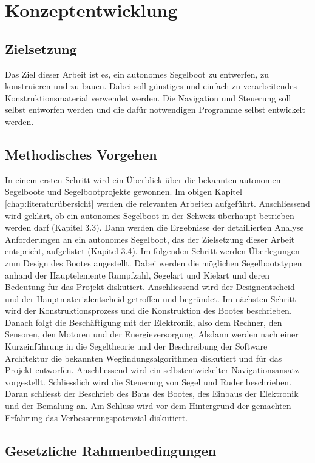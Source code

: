 
\chapter{Konzeptentwicklung }
\label{chap:konzeptentwicklung}
\section{Zielsetzung}
Das Ziel dieser Arbeit ist es, ein autonomes Segelboot zu entwerfen, zu konstruieren und zu bauen. Dabei soll günstiges und einfach zu verarbeitendes Konstruktionsmaterial verwendet werden. Die Navigation und Steuerung soll selbst entworfen werden und die dafür notwendigen Programme selbst entwickelt werden. 

\section{Methodisches Vorgehen}

In einem ersten Schritt wird ein Überblick über die bekannten autonomen Segelboote und Segelbootprojekte gewonnen. Im obigen Kapitel \ref{chap:literaturübersicht} werden die relevanten Arbeiten aufgeführt. Anschliessend wird geklärt, ob ein autonomes Segelboot in der Schweiz überhaupt betrieben werden darf (Kapitel 3.3). Dann werden die Ergebnisse der detaillierten Analyse Anforderungen an ein autonomes Segelboot, das der Zielsetzung dieser Arbeit entspricht, aufgelistet (Kapitel 3.4). Im folgenden Schritt werden Überlegungen zum Design des Bootes angestellt. Dabei werden die möglichen Segelbootstypen anhand der Hauptelemente Rumpfzahl, Segelart und Kielart und deren Bedeutung für das Projekt diskutiert. Anschliessend wird der Designentscheid und der Hauptmaterialentscheid getroffen und begründet. Im nächsten Schritt wird der Konstruktionsprozess und die Konstruktion des Bootes beschrieben. Danach folgt die Beschäftigung mit der Elektronik, also dem Rechner, den Sensoren, den Motoren und der Energieversorgung. Alsdann werden nach einer Kurzeinführung in die Segeltheorie und der Beschreibung der Software Architektur die bekannten Wegfindungsalgorithmen diskutiert und für das Projekt entworfen. Anschliessend wird ein selbstentwickelter Navigationsansatz vorgestellt. Schliesslich wird die Steuerung von Segel und Ruder beschrieben. Daran schliesst der Beschrieb des Baus des Bootes, des Einbaus der Elektronik und der Bemalung an. Am Schluss wird vor dem Hintergrund der gemachten Erfahrung das Verbesserungspotenzial diskutiert.
\section{Gesetzliche Rahmenbedingungen}


